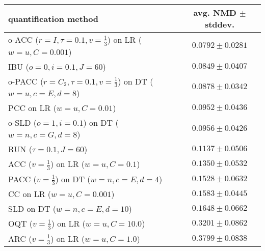 \begin{tabular}{lc}
  \toprule
  quantification method & avg. NMD $\pm$ stddev. \\
  \midrule
  o-ACC ($r=I, \tau=0.1, v=\frac{1}{3}$) on LR ($w=u, C=0.001$) & $\mathbf{0.0792 \pm 0.0281}$ \\
  IBU ($o=0, i=0.1, J=60$) & $0.0849 \pm 0.0407$ \\
  o-PACC ($r=C_2, \tau=0.1, v=\frac{1}{3}$) on DT ($w=u, c=E, d=8$) & $0.0878 \pm 0.0342$ \\
  PCC on LR ($w=u, C=0.01$) & $0.0952 \pm 0.0436$ \\
  o-SLD ($o=1, i=0.1$) on DT ($w=n, c=G, d=8$) & $0.0956 \pm 0.0426$ \\
  RUN ($\tau=0.1, J=60$) & $0.1137 \pm 0.0506$ \\
  ACC ($v=\frac{1}{3}$) on LR ($w=u, C=0.1$) & $0.1350 \pm 0.0532$ \\
  PACC ($v=\frac{1}{3}$) on DT ($w=n, c=E, d=4$) & $0.1528 \pm 0.0632$ \\
  CC on LR ($w=u, C=0.001$) & $0.1583 \pm 0.0445$ \\
  SLD on DT ($w=n, c=E, d=10$) & $0.1648 \pm 0.0662$ \\
  OQT ($v=\frac{1}{3}$) on LR ($w=u, C=10.0$) & $0.3201 \pm 0.0862$ \\
  ARC ($v=\frac{1}{3}$) on LR ($w=u, C=1.0$) & $0.3799 \pm 0.0838$ \\
  \bottomrule
\end{tabular}
